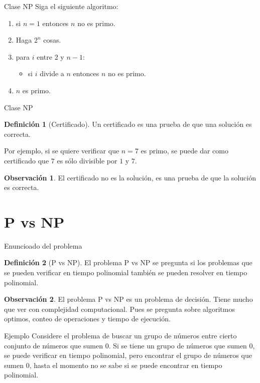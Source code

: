\documentclass[dvipsnames, 11pt]{beamer}
\theoremstyle{plain}
\theoremstyle{definition}
\newtheorem{defi}{Definición}
\newtheorem{obs}{Observación}
\begin{document}
\begin{frame}{Clase NP}
    Siga el siguiente algoritmo:\pause
    \begin{enumerate}
        \item si $n = 1$ entonces $n$ no es primo.\pause
        \item Haga $2 ^{n}$ cosas.\pause
        \item para $i$ entre $2$ y $n -1$:\pause
        \begin{itemize}
            \item si $i$ divide a $n$ entonces $n$ no es primo.\pause
        \end{itemize}
        \item $n$ es primo.
    \end{enumerate}
\end{frame}

\begin{frame}{Clase NP}
    \begin{defi}[Certificado]
        Un certificado es una prueba de que una solución es correcta.
    \end{defi}
    \pause
    Por ejemplo, si se quiere verificar que $n = 7$ es primo, se puede dar como certificado que $7$ es sólo divisible por $1$ y $7$.
    \pause
    \begin{obs}
        El certificado no es la solución, es una prueba de que la solución es correcta.
    \end{obs}
\end{frame}

\section{P vs NP}
\begin{frame}{Enuncioado del problema}
    \begin{defi}[P vs NP]
        El problema P vs NP se pregunta si los problemas que se pueden verificar en tiempo polinomial también se pueden resolver en tiempo polinomial.
    \end{defi}
    \pause
    \begin{obs}
        El problema P vs NP es un problema de decisión. Tiene mucho que ver con complejidad computacional. Pues se pregunta sobre algoritmos optimos, conteo de operaciones y tiempo de ejecución.
    \end{obs}    
\end{frame}
\begin{frame}{Ejemplo}
    Considere el problema de buscar un grupo de números entre cierto conjunto de números que sumen $0$. Si se tiene un grupo de números que sumen $0$, se puede verificar en tiempo polinomial, pero encontrar el grupo de números que sumen $0$, hasta el momento no se sabe si se puede encontrar en tiempo polinomial.
\end{frame}
\end{document}
